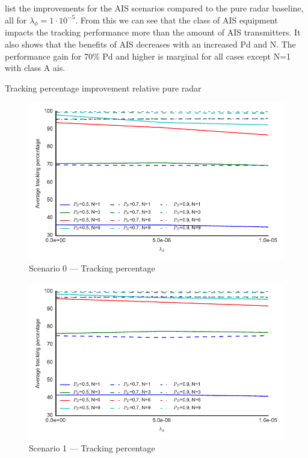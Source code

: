  list the improvements for the AIS scenarios compared to the pure radar baseline, all for \(\lambda_\phi = 1\cdot 10^{-5}\). From this we can see that the class of AIS equipment impacts the tracking performance more than the amount of AIS transmitters. It also shows that the benefits of AIS decreases with an increased \gls{Pd} and N. The performance gain for 70\% \gls{Pd} and higher is marginal for all cases except N=1 with class A \gls{ais}.
\begin{table}[H]
\centering
{}
\caption{Tracking percentage improvement relative pure radar}\label{tab:tracking_percentage_improvement}
\end{table}

\begin{figure}
\centering
\includegraphics{Figures/plots/Scenario0_Tracking-TrackingPercentage.pdf}
\caption{Scenario 0 --- Tracking percentage}\label{fig:scenario0_tracking_percentage}
\end{figure}
\begin{figure}
\centering
\includegraphics{Figures/plots/Scenario1_Tracking-TrackingPercentage.pdf}
\caption{Scenario 1 --- Tracking percentage}\label{fig:scenario1_tracking_percentage}
\end{figure}
